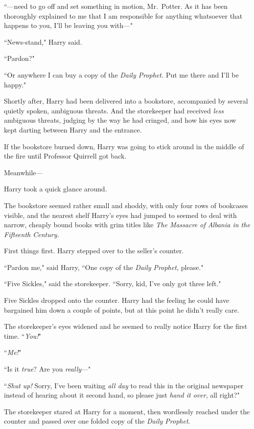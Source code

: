 ``---need to go off and set something in motion, Mr.~Potter. As it has been thoroughly explained to me that I am responsible for anything whatsoever that happens to you, I'll be leaving you with---"

``News-stand," Harry said.

``Pardon?"

``Or anywhere I can buy a copy of the \emph{Daily Prophet.} Put me there and I'll be happy."

Shortly after, Harry had been delivered into a bookstore, accompanied by several quietly spoken, ambiguous threats. And the storekeeper had received \emph{less} ambiguous threats, judging by the way he had cringed, and how his eyes now kept darting between Harry and the entrance.

If the bookstore burned down, Harry was going to stick around in the middle of the fire until Professor Quirrell got back.

Meanwhile---

Harry took a quick glance around.

The bookstore seemed rather small and shoddy, with only four rows of bookcases visible, and the nearest shelf Harry's eyes had jumped to seemed to deal with narrow, cheaply bound books with grim titles like \emph{The Massacre of Albania in the Fifteenth Century.}

First things first. Harry stepped over to the seller's counter.

``Pardon me," said Harry, ``One copy of the \emph{Daily Prophet,} please."

``Five Sickles," said the storekeeper. ``Sorry, kid, I've only got three left."

Five Sickles dropped onto the counter. Harry had the feeling he could have bargained him down a couple of points, but at this point he didn't really care.

The storekeeper's eyes widened and he seemed to really notice Harry for the first time. ``\emph{You!}"

``\emph{Me!}"

``Is it \emph{true}? Are you \emph{really}---"

``\emph{Shut up!} Sorry, I've been waiting \emph{all day} to read this in the original newspaper instead of hearing about it second hand, so please just \emph{hand it over}, all right?"

The storekeeper stared at Harry for a moment, then wordlessly reached under the counter and passed over one folded copy of the \emph{Daily Prophet}.

